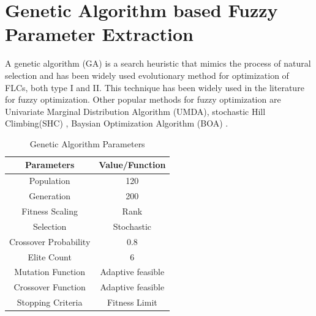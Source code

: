 \section{Genetic Algorithm based Fuzzy Parameter Extraction} \label{sec:FCP}
A genetic algorithm (GA) is a search heuristic that mimics the process of natural selection and has been widely used evolutionary method for optimization of FLCs, both type I and II\cite{Ishibuchi1995a,Shopova2006,Bandyopadhyay2001a,Maldonado2014,Alcala2006a,Sanz2011}. This technique has been widely used in the literature for fuzzy optimization. Other popular methods for fuzzy optimization are Univariate Marginal Distribution Algorithm (UMDA)\cite{bookBehera2009}, stochastic Hill Climbing(SHC) \cite{Michta2011,Chen2003a}, Baysian Optimization Algorithm (BOA) \cite{Jiang2000}. 
\begin{table}
	\centering
	\caption{Genetic Algorithm Parameters}
	\label{tab:GS_Param}
	\begin{tabular}{cc}
		\hline Parameters & Value/Function \\ 
		\hline Population & 120 \\ 
		Generation & 200 \\ 
		Fitness Scaling & Rank \\ 
		Selection & Stochastic \\ 
		Crossover Probability & 0.8 \\ 
		Elite Count & 6 \\ 
		Mutation Function & Adaptive feasible  \\ 
		Crossover Function & Adaptive feasible  \\ 
		Stopping Criteria & Fitness Limit \\ 
		\hline 
	\end{tabular} 
\end{table}

